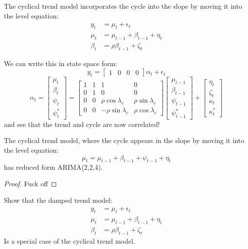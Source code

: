 \documentclass[DIV=14,titlepage=false]{scrreprt}
\begin{document}
\begin{definition}
    The cyclical trend model incorporates the cycle into the slope by moving it into the level equation:
    \begin{align*}
        y_t &= \mu_t + \epsilon_t\\
        \mu_t &= \mu_{t-1} + \beta_{t-1} + \eta_t\\
        \beta_t &= \rho \beta_{t-1} + \zeta_t
    \end{align*}
\end{definition}
We can write this in state space form:
\[
    y_t = \begin{bmatrix} 1 & 0 & 0 & 0 \end{bmatrix} \alpha_t + \epsilon_t
\]
\[
    \alpha_t = \begin{bmatrix} \mu_t \\ \beta_t \\ \psi_t \\ \psi_t^* \end{bmatrix} = \begin{bmatrix} 1 & 1 & 1 & 0 \\ 0 & 1 & 0 & 0 \\ 0 & 0 & \rho \cos \lambda_c & \rho \sin \lambda_c \\ 0 & 0 & -\rho \sin \lambda_c & \rho \cos \lambda_c \end{bmatrix} \begin{bmatrix} \mu_{t-1} \\ \beta_{t-1} \\ \psi_{t-1} \\ \psi_{t-1}^* \end{bmatrix} + \begin{bmatrix} \eta_t \\ \zeta_t \\ \kappa_t \\ \kappa_t^* \end{bmatrix}
\]
and see that the trend and cycle are now correlated!
\begin{claim}
    The cyclical trend model, where the cycle appears in the slope by moving it into the level equation:
    \[
        \mu_t = \mu_{t-1} + \beta_{t-1} + \psi_{t-1} + \eta_t
    \]
    has reduced form ARIMA(2,2,4).
\end{claim}
\begin{proof}
    Fuck off
\end{proof}
\begin{question}
    Show that the damped trend model:
    \begin{align*}
        y_t &= \mu_t + \epsilon_t\\
        \mu_t &= \mu_{t-1} + \beta_{t-1} + \eta_t\\
        \beta_t &= \rho \beta_{t-1} + \zeta_t
    \end{align*}
    Is a special case of the cyclical trend model.
\end{question}
\end{document}
